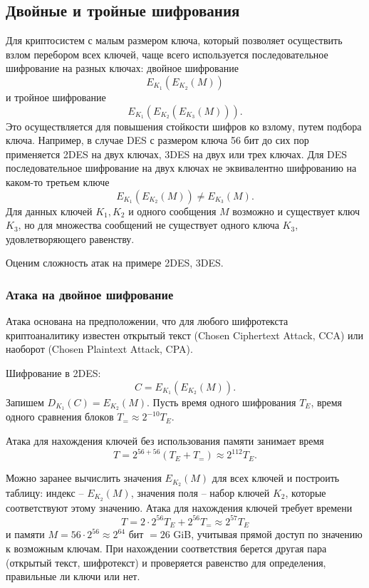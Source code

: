 \subsection{Двойные и тройные шифрования}

Для криптосистем с малым размером ключа, который позволяет осуществить взлом перебором всех ключей, чаще всего используется последовательное шифрование на разных ключах: двойное шифрование
    \[ E_{K_1}( E_{K_2}( M)) \]
и тройное шифрование
    \[ E_{K_1}( E_{K_2}( E_{K_3} (M))). \]
Это осуществляется для повышения стойкости шифров ко взлому, путем подбора ключа.
Например, в случае DES с размером ключа 56 бит до сих пор применяется 2DES на двух ключах, 3DES на двух или трех ключах. Для DES последовательное шифрование на двух ключах не эквивалентно шифрованию на каком-то третьем ключе
    \[ E_{K_1}( E_{K_2} (M)) \neq E_{K_3}(M). \]
Для данных ключей $K_1, K_2$ и одного сообщения $M$ возможно и существует ключ $K_3$, но для множества сообщений не существует одного ключа $K_3$, удовлетворяющего равенству.

Оценим сложность атак на примере 2DES, 3DES.


\subsubsection{Атака на двойное шифрование}


Атака основана на предположении, что для любого шифротекста криптоаналитику известен открытый текст (Chosen Ciphertext Attack, CCA) или наоборот (Chosen Plaintext Attack, CPA).

Шифрование в 2DES:
    \[ C = E_{K_1}( E_{K_2}(M)). \]
Запишем $D_{K_1}(C) = E_{K_2}(M)$. Пусть время одного шифрования $T_E$, время одного сравнения блоков $T_{=} \approx 2^{-10} T_E$.

Атака для нахождения ключей без использования памяти занимает время
    \[ T = 2^{56 + 56} (T_E + T_{=}) \approx 2^{112} T_E. \]

Можно заранее вычислить значения $E_{K_2}(M)$ для всех ключей и построить таблицу: индекс -- $E_{K_2}(M)$, значения поля -- набор ключей $K_2$, которые соответствуют этому значению. Атака для нахождения ключей требует времени
    \[ T = 2 \cdot 2^{56} T_E + 2^{56} T_{=} \approx 2^{57} T_E \]
и памяти $M = 56 \cdot 2^{56} \approx 2^{64}$ бит $= 26$ GiB, учитывая прямой доступ по значению к возможным ключам. При нахождении соответствия берется другая пара (открытый текст, шифротекст) и проверяется равенство для определения, правильные ли ключи или нет.

